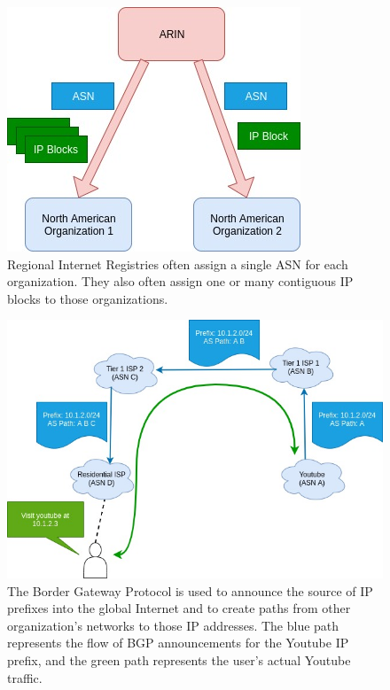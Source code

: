 \documentclass[conference]{IEEEtran}
\begin{document}
\begin{figure}[ht]
  \begin{center}
    \includegraphics[width=0.6\linewidth]{images/rir-assignments.jpg}
  \end{center}
  \caption{Regional Internet Registries often assign a single ASN for each organization.  They also often assign one or many contiguous IP blocks to those organizations.}
  \label{fig:rir-assignments}
\end{figure}

\begin{figure}[hb]
  \includegraphics[width=\linewidth]{images/bgp-ops.jpg}
  \caption{The Border Gateway Protocol is used to announce the source of IP prefixes into the global Internet and to create paths from other organization's networks to those IP addresses.  The blue path represents the flow of BGP announcements for the Youtube IP prefix, and the green path represents the user's actual Youtube traffic.}
  \label{fig:bgp-ops}
\end{figure}
\end{document}
